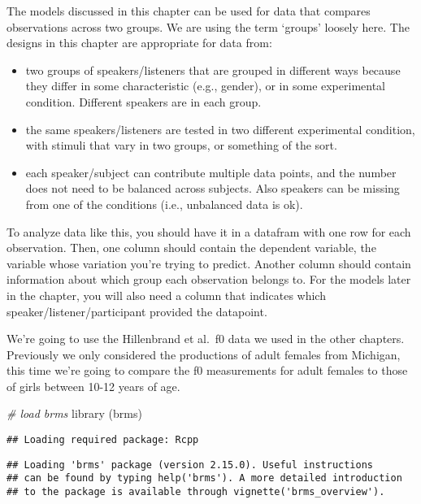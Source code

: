 \documentclass[
]{book}
\newenvironment{Shaded}{\begin{snugshade}}{\end{snugshade}}
\newcommand{\CommentTok}[1]{\textcolor[rgb]{0.56,0.35,0.01}{\textit{#1}}}
\newcommand{\FunctionTok}[1]{\textcolor[rgb]{0.00,0.00,0.00}{#1}}
\newcommand{\NormalTok}[1]{#1}
\begin{document}
The models discussed in this chapter can be used for data that compares observations across two groups. We are using the term `groups' loosely here. The designs in this chapter are appropriate for data from:

\begin{itemize}
\item
  two groups of speakers/listeners that are grouped in different ways because they differ in some characteristic (e.g., gender), or in some experimental condition. Different speakers are in each group.
\item
  the same speakers/listeners are tested in two different experimental condition, with stimuli that vary in two groups, or something of the sort.
\item
  each speaker/subject can contribute multiple data points, and the number does not need to be balanced across subjects. Also speakers can be missing from one of the conditions (i.e., unbalanced data is ok).
\end{itemize}

To analyze data like this, you should have it in a datafram with one row for each observation. Then, one column should contain the dependent variable, the variable whose variation you're trying to predict. Another column should contain information about which group each observation belongs to. For the models later in the chapter, you will also need a column that indicates which speaker/listener/participant provided the datapoint.

We're going to use the Hillenbrand et al.~f0 data we used in the other chapters. Previously we only considered the productions of adult females from Michigan, this time we're going to compare the f0 measurements for adult females to those of girls between 10-12 years of age.

\begin{Shaded}
\begin{Highlighting}[]
\CommentTok{\# load brms}
\FunctionTok{library}\NormalTok{ (brms)}
\end{Highlighting}
\end{Shaded}

\begin{verbatim}
## Loading required package: Rcpp
\end{verbatim}

\begin{verbatim}
## Loading 'brms' package (version 2.15.0). Useful instructions
## can be found by typing help('brms'). A more detailed introduction
## to the package is available through vignette('brms_overview').
\end{verbatim}
\end{document}
